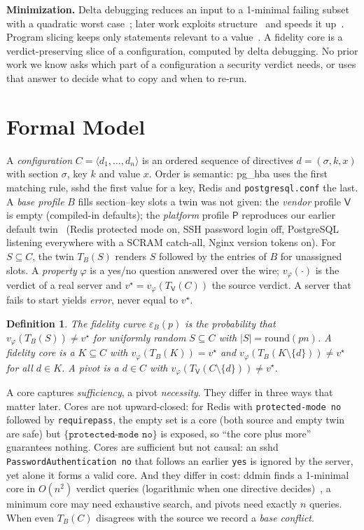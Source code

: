 \documentclass[conference]{IEEEtran}
\newtheorem{definition}{Definition}
\newcommand{\Vb}{\mathsf{V}}
\newcommand{\Pb}{\mathsf{P}}
\begin{document}
\textbf{Minimization.} Delta debugging reduces an input to a 1-minimal failing subset~\cite{zeller2002} with a quadratic worst case~\cite{hildebrandt2000}; later work exploits structure~\cite{hdd2006} and speeds it up~\cite{hodovan2016}. Program slicing keeps only statements relevant to a value~\cite{weiser1984}. A fidelity core is a verdict-preserving slice of a configuration, computed by delta debugging. No prior work we know asks which part of a configuration a security verdict needs, or uses that answer to decide what to copy and when to re-run.



\section{Formal Model}\label{sec:concepts}

A \emph{configuration} $C=\langle d_1,\dots,d_n\rangle$ is an ordered sequence of directives $d=(\sigma,k,x)$ with section $\sigma$, key $k$ and value $x$. Order is semantic: pg\_hba uses the first matching rule, sshd the first value for a key, Redis and \texttt{postgresql.conf} the last. A \emph{base profile} $B$ fills section--key slots a twin was not given: the \emph{vendor} profile $\Vb$ is empty (compiled-in defaults); the \emph{platform} profile $\Pb$ reproduces our earlier default twin~\cite{dtplatform} (Redis protected mode on, SSH password login off, PostgreSQL listening everywhere with a SCRAM catch-all, Nginx version tokens on). For $S\subseteq C$, the twin $T_B(S)$ renders $S$ followed by the entries of $B$ for unassigned slots. A \emph{property} $\varphi$ is a yes/no question answered over the wire; $v_\varphi(\cdot)$ is the verdict of a real server and $v^\star=v_\varphi(T_\Vb(C))$ the source verdict. A server that fails to start yields \emph{error}, never equal to $v^\star$.

\begin{definition}
The \emph{fidelity curve} $\varepsilon_B(p)$ is the probability that $v_\varphi(T_B(S))\neq v^\star$ for uniformly random $S\subseteq C$ with $|S|=\mathrm{round}(pn)$. A \emph{fidelity core} is a $K\subseteq C$ with $v_\varphi(T_B(K))=v^\star$ and $v_\varphi(T_B(K\setminus\{d\}))\neq v^\star$ for all $d\in K$. A \emph{pivot} is a $d\in C$ with $v_\varphi(T_\Vb(C\setminus\{d\}))\neq v^\star$.
\end{definition}

A core captures \emph{sufficiency}, a pivot \emph{necessity}. They differ in three ways that matter later. Cores are not upward-closed: for Redis with \texttt{protected-mode no} followed by \texttt{requirepass}, the empty set is a core (both source and empty twin are safe) but $\{\texttt{protected-mode no}\}$ is exposed, so ``the core plus more'' guarantees nothing. Cores are sufficient but not causal: an sshd \texttt{PasswordAuthentication no} that follows an earlier \texttt{yes} is ignored by the server, yet alone it forms a valid core. And they differ in cost: ddmin finds a 1-minimal core in $O(n^2)$ verdict queries (logarithmic when one directive decides)~\cite{hildebrandt2000}, a minimum core may need exhaustive search, and pivots need exactly $n$ queries. When even $T_B(C)$ disagrees with the source we record a \emph{base conflict}.
\end{document}
